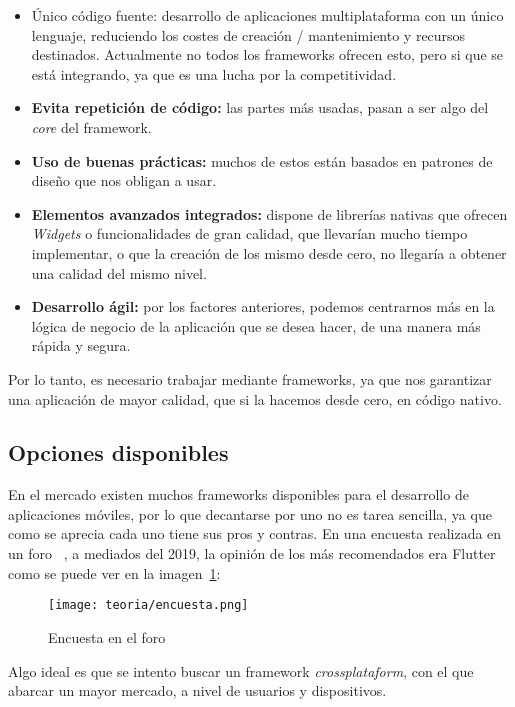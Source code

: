 \begin{itemize}
	\item{Único código fuente}: desarrollo de aplicaciones multiplataforma con un único lenguaje, reduciendo los costes de creación / mantenimiento y recursos destinados. Actualmente no todos los frameworks ofrecen esto, pero si que se está integrando, ya que es una lucha por la competitividad.
	\item \textbf{Evita repetición de código:} las partes más usadas, pasan a ser algo del \emph{core} del framework.
	\item \textbf{Uso de buenas prácticas:} muchos de estos están basados en patrones de diseño que nos obligan a usar.
	\item \textbf{Elementos avanzados integrados:} dispone de librerías nativas que ofrecen \emph{Widgets} o funcionalidades de gran calidad, que llevarían mucho tiempo implementar, o que la creación de los mismo desde cero, no llegaría a obtener una calidad del mismo nivel.
	\item \textbf{Desarrollo ágil:} por los factores anteriores, podemos centrarnos más en la lógica de negocio de la aplicación que se desea hacer, de una manera más rápida y segura.
\end{itemize}

Por lo tanto, es necesario trabajar mediante frameworks, ya que nos garantizar una aplicación de mayor calidad, que si la hacemos desde cero, en código nativo.

\subsection{Opciones disponibles}
En el mercado existen muchos frameworks disponibles para el desarrollo de aplicaciones móviles, por lo que decantarse por uno no es tarea sencilla, ya que como se aprecia cada uno tiene sus pros y contras. En una encuesta realizada en un foro ~\cite{foro:encuesta}, a mediados del 2019, la opinión de los más recomendados era Flutter como se puede ver en la imagen~\ref{fig:encuesta}:

\begin{figure}[h]
	\centering
	\texttt{[image: teoria/encuesta.png]}
	\caption{Encuesta en el foro}\label{fig:encuesta}
\end{figure}

Algo ideal es que se intento buscar un framework \emph{crossplataform}, con el que abarcar un mayor mercado, a nivel de usuarios y dispositivos.

